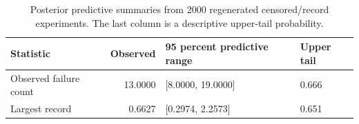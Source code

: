 \begin{table}[htbp]
\centering
\caption{Posterior predictive summaries from 2000 regenerated censored/record experiments. The last column is a descriptive upper-tail probability.}\label{tab:predictive}
\small
\begin{tabular}{lrll}
\toprule
Statistic & Observed & 95 percent predictive range & Upper tail \\
\midrule
Observed failure count & 13.0000 & [8.0000, 19.0000] & 0.666 \\
Largest record & 0.6627 & [0.2974, 2.2573] & 0.651 \\
\bottomrule
\end{tabular}
\end{table}
